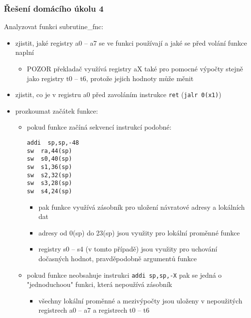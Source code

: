 \documentclass{beamer}
\begin{document}
\begin{frame}[fragile,shrink=5]
\frametitle{Řešení domácího úkolu 4}

Analyzovat funkci subrutine\_fnc:
\begin{itemize}
\item zjistit, jaké registry a0 -- a7 se ve funkci používají a jaké se před volání funkce naplní
 \begin{itemize}
 \item POZOR překladač využívá registry aX také pro pomocné výpočty stejně jako registry t0 -- t6, protože jejich hodnoty může měnit
 \end{itemize}
\item zjistit, co je v registru a0 před zavoláním instrukce \texttt{ret} (\texttt{jalr 0(x1)})
\item prozkoumat začátek funkce:
 \begin{itemize}
 \item pokud funkce začíná sekvencí instrukcí podobné:
\begin{verbatim}
addi  sp,sp,-48
sw  ra,44(sp)
sw  s0,40(sp)
sw  s1,36(sp)
sw  s2,32(sp)
sw  s3,28(sp)
sw  s4,24(sp)
\end{verbatim}
\begin{itemize}
 \item pak funkce využívá zásobník pro uložení návratové adresy a lokálních dat
 \item adresy od 0(sp) do 23(sp) jsou využity pro lokální proměnné funkce
 \item registry s0 -- s4 (v tomto případě) jsou využity pro uchování dočasných hodnot, pravděpodobně argumentů funkce
 \end{itemize}
 \item pokud funkce neobsahuje instrukci \texttt{addi sp,sp,-X} pak se jedná o "jednoduchoou" funkci, která nepoužívá zásobník
\begin{itemize}
 \item všechny lokální proměnné a mezivýpočty jsou uloženy v nepoužitých registrech a0 -- a7 a registrech t0 -- t6
 \end{itemize}
 \end{itemize}
 \end{itemize}
\end{frame}
\end{document}
